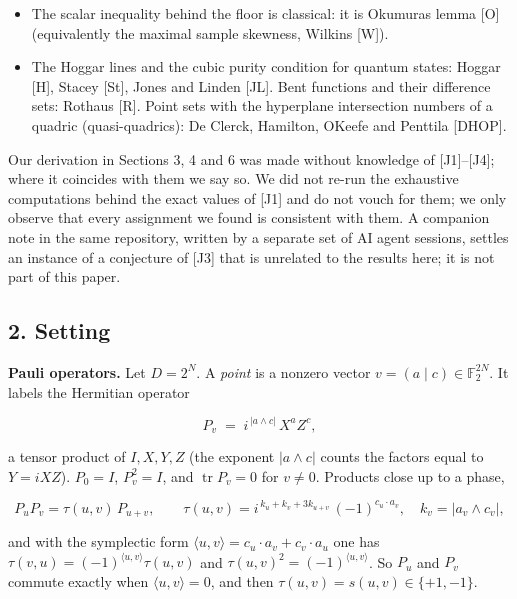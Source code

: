 \documentclass[11pt,a4paper]{article}
\begin{document}
\begin{itemize}
  {[}CGK{]}. \(\mathbb{Z}_4\)-valued quadratic forms and their character sums: {[}CCKS{]}. Two-character sets,
  two-weight codes and strongly regular graphs: Calderbank and Kantor {[}CK{]}. The bent functions of
  Maiorana and McFarland: {[}McF{]}.
\item
  The scalar inequality behind the floor is classical: it is Okumura\textquotesingle s lemma {[}O{]} (equivalently the
  maximal sample skewness, Wilkins {[}W{]}).
\item
  The Hoggar lines and the cubic purity condition for quantum states: Hoggar {[}H{]}, Stacey {[}St{]},
  Jones and Linden {[}JL{]}. Bent functions and their difference sets: Rothaus {[}R{]}. Point sets with the
  hyperplane intersection numbers of a quadric (quasi-quadrics): De Clerck, Hamilton, O\textquotesingle Keefe and
  Penttila {[}DHOP{]}.
\end{itemize}

Our derivation in Sections 3, 4 and 6 was made without knowledge of {[}J1{]}--{[}J4{]}; where it coincides with
them we say so. We did not re-run the exhaustive computations behind the exact values of {[}J1{]} and do
not vouch for them; we only observe that every assignment we found is consistent with them. A companion
note in the same repository, written by a separate set of AI agent sessions, settles an instance of a
conjecture of {[}J3{]} that is unrelated to the results here; it is not part of this paper.

\subsection{2. Setting}\label{2-setting}

\textbf{Pauli operators.} Let \(D = 2^N\). A \emph{point} is a nonzero vector \(v = (a \mid c) \in \mathbb{F}_2^{2N}\).
It labels the Hermitian operator

\[P_v \;=\; i^{\,|a \wedge c|}\, X^{a} Z^{c},\]

a tensor product of \(I, X, Y, Z\) (the exponent \(|a \wedge c|\) counts the factors equal to \(Y = iXZ\)).
\(P_0 = I\), \(P_v^2 = I\), and \(\operatorname{tr} P_v = 0\) for \(v \ne 0\). Products close up to a phase,

\[P_u P_v = \tau(u,v)\, P_{u+v}, \qquad
\tau(u,v) = i^{\,k_u + k_v + 3 k_{u+v}}\,(-1)^{c_u \cdot a_v}, \quad k_v = |a_v \wedge c_v| ,\]

and with the symplectic form \(\langle u, v\rangle = c_u\cdot a_v + c_v \cdot a_u\) one has
\(\tau(v,u) = (-1)^{\langle u,v\rangle}\tau(u,v)\) and \(\tau(u,v)^2 = (-1)^{\langle u,v\rangle}\).
So \(P_u\) and \(P_v\) commute exactly when \(\langle u,v\rangle = 0\), and then \(\tau(u,v) = s(u,v) \in \{+1,-1\}\).
\end{document}
